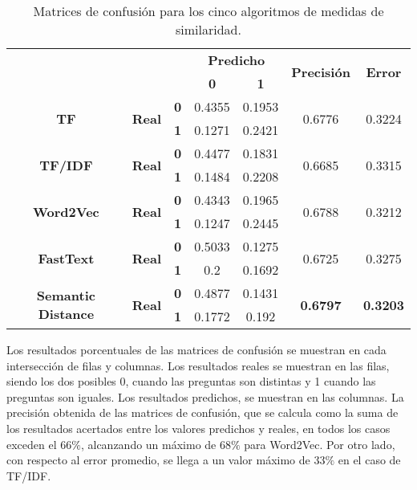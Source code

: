 \begin{table}[]
	\small
	\centering
	\begin{tabular}{|c|c|c|c|c|c|c|}
		\hline
		\multicolumn{3}{|l|}{\multirow{2}{*}{}} &
		\multicolumn{2}{c|}{\textbf{Predicho}} &
		\multirow{2}{*}{\textbf{Precisión}} &
		\multirow{2}{*}{\textbf{Error}} \\ \cline{4-5}
		\multicolumn{3}{|l|}{} &
		\textbf{0} &
		\textbf{1} &
		&
		\\ \hline
		\multirow{2}{*}{\textbf{TF}} &
		\multirow{2}{*}{\textbf{Real}} &
		\textbf{0} &
		0.4355 &
		0.1953 &
		\multirow{2}{*}{0.6776} &
		\multirow{2}{*}{0.3224} \\ \cline{3-5}
		&
		&
		\textbf{1} &
		0.1271 &
		0.2421 &
		&
		\\ \hline
		\multirow{2}{*}{\textbf{TF/IDF}} &
		\multirow{2}{*}{\textbf{Real}} &
		\textbf{0} &
		0.4477 &
		0.1831 &
		\multirow{2}{*}{0.6685} &
		\multirow{2}{*}{0.3315} \\ \cline{3-5}
		&
		&
		\textbf{1} &
		0.1484 &
		0.2208 &
		&
		\\ \hline
		\multirow{2}{*}{\textbf{Word2Vec}} &
		\multirow{2}{*}{\textbf{Real}} &
		\textbf{0} &
		0.4343 &
		0.1965 &
		\multirow{2}{*}{0.6788} &
		\multirow{2}{*}{0.3212} \\ \cline{3-5}
		&
		&
		\textbf{1} &
		0.1247 &
		0.2445 &
		&
		\\ \hline
		\multirow{2}{*}{\textbf{FastText}} &
		\multirow{2}{*}{\textbf{Real}} &
		\textbf{0} &
		0.5033 &
		0.1275 &
		\multirow{2}{*}{0.6725} &
		\multirow{2}{*}{0.3275} \\ \cline{3-5}
		&
		&
		\textbf{1} &
		0.2 &
		0.1692 &
		&
		\\ \hline
		\multirow{2}{*}{\textbf{Semantic Distance}} &
		\multirow{2}{*}{\textbf{Real}} &
		\textbf{0} &
		0.4877 &
		0.1431 &
		\multirow{2}{*}{\textbf{0.6797}} &
		\multirow{2}{*}{\textbf{0.3203}} \\ \cline{3-5}
		&
		&
		\textbf{1} &
		0.1772 &
		0.192 &
		&
		\\ \hline
	\end{tabular}
	\caption{Matrices de confusión para los cinco algoritmos de medidas de similaridad.}
	\label{tab:desempeno-estado-del-arte}
\end{table}

\bigskip Los resultados porcentuales de las matrices de confusión se muestran en cada intersección de filas y columnas. Los resultados reales se muestran en las filas, siendo los dos posibles 0, cuando las preguntas son distintas y 1 cuando las preguntas son iguales. Los resultados predichos, se muestran en las columnas.
La precisión obtenida de las matrices de confusión, que se calcula como la suma de los resultados acertados entre los valores predichos y reales, en todos los casos exceden el \(66\%\), alcanzando un máximo de \(68\% \) para Word2Vec. Por otro lado, con respecto al error promedio, se llega a un valor máximo de \(33\%\) en el caso de TF/IDF.

